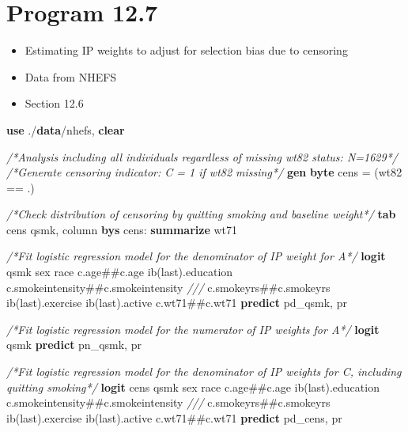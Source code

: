 \documentclass[
  10pt,
]{book}
\newenvironment{Shaded}{\begin{snugshade}}{\end{snugshade}}
\newcommand{\CommentTok}[1]{\textcolor[rgb]{0.56,0.35,0.01}{\textit{#1}}}
\newcommand{\FunctionTok}[1]{\textcolor[rgb]{0.00,0.00,0.00}{#1}}
\newcommand{\KeywordTok}[1]{\textcolor[rgb]{0.13,0.29,0.53}{\textbf{#1}}}
\newcommand{\NormalTok}[1]{#1}
\providecommand{\tightlist}{%
  \setlength{\itemsep}{0pt}\setlength{\parskip}{0pt}}
\begin{document}
\hypertarget{program-12.7}{%
\section{Program 12.7}\label{program-12.7}}

\begin{itemize}
\tightlist
\item
  Estimating IP weights to adjust for selection bias due to censoring
\item
  Data from NHEFS
\item
  Section 12.6
\end{itemize}

\begin{Shaded}
\begin{Highlighting}[]
\KeywordTok{use}\NormalTok{ ./}\KeywordTok{data}\NormalTok{/nhefs, }\KeywordTok{clear}

\CommentTok{/*Analysis including all individuals regardless of missing wt82 status: N=1629*/}
\CommentTok{/*Generate censoring indicator: C = 1 if wt82 missing*/}
\KeywordTok{gen} \KeywordTok{byte}\NormalTok{ cens = (wt82 == .)}

\CommentTok{/*Check distribution of censoring by quitting smoking and baseline weight*/}
\KeywordTok{tab}\NormalTok{ cens qsmk, column}
\KeywordTok{bys}\NormalTok{ cens: }\KeywordTok{summarize}\NormalTok{ wt71}

\CommentTok{/*Fit logistic regression model for the  denominator of IP weight for A*/}
\KeywordTok{logit}\NormalTok{ qsmk sex race c.age##c.age ib(}\FunctionTok{last}\NormalTok{).education c.smokeintensity##c.smokeintensity }\CommentTok{///}
\NormalTok{c.smokeyrs##c.smokeyrs ib(}\FunctionTok{last}\NormalTok{).exercise ib(}\FunctionTok{last}\NormalTok{).active c.wt71##c.wt71 }
\KeywordTok{predict}\NormalTok{ pd_qsmk, pr}

\CommentTok{/*Fit logistic regression model for the  numerator of IP weights for A*/}
\KeywordTok{logit}\NormalTok{ qsmk}
\KeywordTok{predict}\NormalTok{ pn_qsmk, pr}

\CommentTok{/*Fit logistic regression model for the  denominator of IP weights for C, including quitting smoking*/}
\KeywordTok{logit}\NormalTok{ cens qsmk sex race c.age##c.age ib(}\FunctionTok{last}\NormalTok{).education c.smokeintensity##c.smokeintensity }\CommentTok{///}
\NormalTok{c.smokeyrs##c.smokeyrs ib(}\FunctionTok{last}\NormalTok{).exercise ib(}\FunctionTok{last}\NormalTok{).active c.wt71##c.wt71 }
\KeywordTok{predict}\NormalTok{ pd_cens, pr}


\end{Highlighting}
\end{Shaded}
\end{document}
